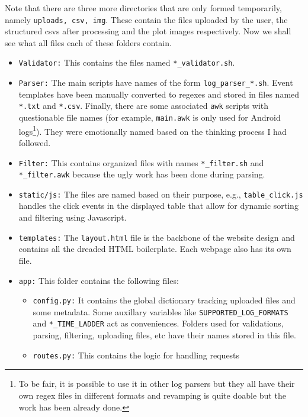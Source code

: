 \documentclass[11pt]{scrartcl}
\begin{document}
Note that there are three more directories that are only formed temporarily,
namely \texttt{uploads, csv, img}. These contain the files uploaded by the user,
the structured csvs after processing and the plot images respectively.
Now we shall see what all files each of these folders contain.

\begin{itemize}
  \item \texttt{Validator:} This contains the files named
    \texttt{*\_validator.sh}.
  \item \texttt{Parser:} The main scripts have names of the form
    \texttt{log\_parser\_*.sh}. Event templates have been manually converted to
    regexes and stored in files named \texttt{*.txt} and \texttt{*.csv}.
    Finally, there are some associated \texttt{awk} scripts with questionable
    file names (for example, \texttt{main.awk} is only used for Android
    logs\footnote{To be fair, it is possible to use it in other log parsers but
    they all have their own regex files in different formats and revamping is
    quite doable but the work has been already done.}). They were emotionally
    named based on the thinking process I had followed.
  \item \texttt{Filter:} This contains organized files with names
    \texttt{*\_filter.sh} and \texttt{*\_filter.awk} because the ugly work has
    been done during parsing.
  \item \texttt{static/js:} The files are named based on their purpose, e.g.,
    \texttt{table\_click.js} handles the click events in the displayed table
    that allow for dynamic sorting and filtering using Javascript.
  \item \texttt{templates:} The \texttt{layout.html} file is the backbone of the
    website design and contains all the dreaded HTML boilerplate. Each
    webpage also has its own file.
  \item \texttt{app:} This folder contains the following files:
    \begin{itemize}
      \item \texttt{config.py:} It contains the global dictionary tracking
        uploaded files and some metadata. Some auxillary variables like
        \texttt{SUPPORTED\_LOG\_FORMATS} and \texttt{*\_TIME\_LADDER} act
        as conveniences. Folders used for validations, parsing, filtering,
        uploading files, etc have their names stored in this file.
      \item \texttt{routes.py:} This contains the logic for handling requests

\end{itemize}
\end{itemize}
\end{document}
